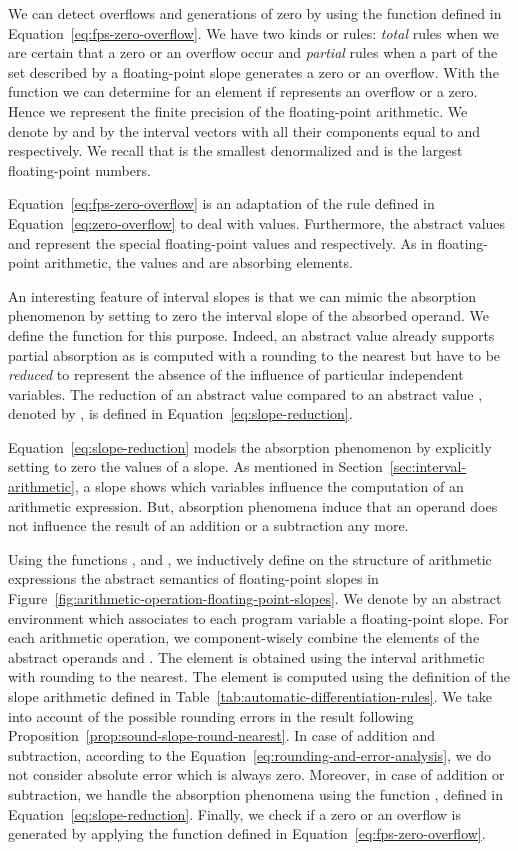 We can detect overflows and generations of zero by using the function
 defined in Equation~\eqref{eq:fps-zero-overflow}. We have two
kinds or rules: \textit{total} rules when we are certain that a zero
or an overflow occur and \textit{partial} rules when a part of the set
described by a floating-point slope generates a zero or an
overflow. With the function  we can determine for an element
 if  represents an overflow or a zero. Hence we represent
the finite precision of the floating-point arithmetic. We denote by
 and by  the
interval vectors with all their components equal to
 and  respectively. We recall
that  is the smallest denormalized and  is the largest
floating-point numbers. {\small
  
}Equation~\eqref{eq:fps-zero-overflow} is an adaptation of the rule
defined in Equation~\eqref{eq:zero-overflow} to deal with \fps
values. Furthermore, the abstract values  and  represent the
special floating-point values  and  respectively. As
in floating-point arithmetic, the values  and  are absorbing
elements.

An interesting feature of interval slopes is that we can mimic the
absorption phenomenon by setting to zero the interval slope of the
absorbed operand. We define the function  for this
purpose. Indeed, an abstract value 
already supports partial absorption as  is computed with
a rounding to the nearest but  have to be
\textit{reduced} to represent the absence of the influence of
particular independent variables. The reduction of an abstract value
 compared to an abstract value
, denoted by , is
defined in Equation~\eqref{eq:slope-reduction}.  {\small
  
}Equation~\eqref{eq:slope-reduction} models the absorption phenomenon
by explicitly setting to zero the values of a slope. As mentioned in
Section~\ref{sec:interval-arithmetic}, a slope shows which variables
influence the computation of an arithmetic expression. But, absorption
phenomena induce that an operand does not influence the result of an
addition or a subtraction any more.

Using the functions ,  and , we inductively define
on the structure of arithmetic expressions the abstract semantics
 of floating-point slopes in
Figure~\ref{fig:arithmetic-operation-floating-point-slopes}. We denote
by  an abstract environment which associates to
each program variable a floating-point slope. For each arithmetic
operation, we component-wisely combine the elements of the abstract
operands  and . The element  is obtained using the
interval arithmetic with rounding to the nearest. The element
 is computed using the definition of the slope
arithmetic defined in Table~\ref{tab:automatic-differentiation-rules}.
We take into account of the possible rounding errors in the result
 following
Proposition~\ref{prop:sound-slope-round-nearest}. In case of addition
and subtraction, according to the
Equation~\eqref{eq:rounding-and-error-analysis}, we do not consider
absolute error  which is always zero. Moreover, in
case of addition or subtraction, we handle the absorption phenomena
using the function , defined in
Equation~\eqref{eq:slope-reduction}. Finally, we check if a zero or an
overflow is generated by applying the function  defined in
Equation~\eqref{eq:fps-zero-overflow}.

